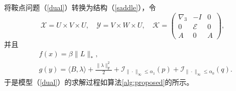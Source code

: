 \documentclass{beamer}
\begin{document}

\begin{frame}
	将鞍点问题（\ref{dual}）转换为结构（\ref{saddle}），令$$\mathcal{X}=U\times V\times U,\quad \mathcal{Y}=V\times W\times U, \quad
	\mathcal{K}=
\begin{pmatrix}
\nabla_3 & -I & 0\\
0 & \mathcal{E} & 0\\
A & 0 & A
\end{pmatrix},
$$
并且
\begin{equation*}
\begin{aligned}
&f(x)=\beta\|L\|_*,\\
&g(y)=\langle B,\lambda\rangle+\frac{\|\lambda\|_\mathrm{F}^2}{2}+\mathcal{I}_{\|\cdot\|_\infty\leq\alpha_1}(p)+\mathcal{I}_{\|\cdot\|_\infty\leq\alpha_0}(q).
\end{aligned}
\end{equation*}
于是模型（\ref{dual}）的求解过程如算法\ref{alg:proposed}的所示。
\end{frame}
\end{document}
